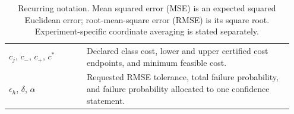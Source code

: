 \begin{table}[t]
\begin{tabular}{@{}p{0.26\linewidth}p{0.69\linewidth}@{}}
$c_j$, $c_-$, $c_+$, $c^*$ & Declared class cost, lower and upper certified cost endpoints, and minimum feasible cost. \\
$\epsilon_h$, $\delta$, $\alpha$ & Requested RMSE tolerance, total failure probability, and failure probability allocated to one confidence statement. \\
\bottomrule
\end{tabular}
\caption{Recurring notation. Mean squared error (MSE) is an expected squared Euclidean error; root-mean-square error (RMSE) is its square root. Experiment-specific coordinate averaging is stated separately.}
\label{tab:notation}
\end{table}
